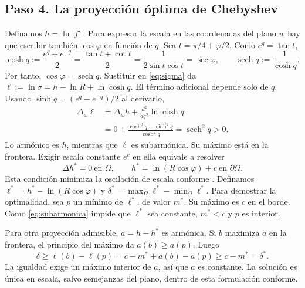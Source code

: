 \subsection{Paso 4. La proyección óptima de Chebyshev}
Definamos $h=\ln|f'|$. Para expresar la escala en las coordenadas del plano $w$ hay que escribir también $\cos\varphi$ en función de $q$. Sea $t=\pi/4+\varphi/2$. Como $e^q=\tan t$,
\begin{equation}
 \cosh q:=\frac{e^q+e^{-q}}2
 =\frac{\tan t+\cot t}2
 =\frac1{2\sin t\cos t}
 =\sec\varphi,\qquad \operatorname{sech}q:=\frac1{\cosh q}.
 \label{eq:hiperbolicas}
\end{equation}
Por tanto, $\cos\varphi=\operatorname{sech}q$. Sustituir en \eqref{eq:sigma} da $\ell:=\ln\sigma=h-\ln R+\ln\cosh q$. El término adicional depende solo de $q$. Usando $\sinh q=(e^q-e^{-q})/2$ al derivarlo,
\begin{equation}
 \begin{aligned}
 \Delta_w\ell&=\Delta_w h+\frac{d^2}{dq^2}\ln\cosh q\\
 &=0+\frac{\cosh^2q-\sinh^2q}{\cosh^2q}
 =\operatorname{sech}^2q>0.
 \end{aligned}\label{eq:subarmonica}
\end{equation}
Lo armónico es $h$, mientras que $\ell$ es subarmónica. Su máximo está en la frontera. Exigir escala constante $e^c$ en ella equivale a resolver
\begin{equation}
 \Delta h^*=0\ \text{en }\Omega,\qquad
 h^*=\ln(R\cos\varphi)+c\ \text{en }\partial\Omega.
 \label{eq:dirichlet}
\end{equation}
Esta condición minimiza la oscilación de escala conforme \cite{milnor1969,bermejo2005}. Definamos $\ell^*=h^*-\ln(R\cos\varphi)$ y $\delta^*=\max_\Omega\ell^*-\min_\Omega\ell^*$. Para demostrar la optimalidad, sea $p$ un mínimo de $\ell^*$, de valor $m^*$. Su máximo es $c$ en el borde. Como \eqref{eq:subarmonica} impide que $\ell^*$ sea constante, $m^*<c$ y $p$ es interior.

Para otra proyección admisible, $a=h-h^*$ es armónica. Si $b$ maximiza $a$ en la frontera, el principio del máximo da $a(b)\ge a(p)$. Luego
\begin{equation}
 \delta\ge\ell(b)-\ell(p)
 =c-m^*+a(b)-a(p)\ge c-m^*=\delta^*.
 \label{eq:optimalidad}
\end{equation}
La igualdad exige un máximo interior de $a$, así que $a$ es constante. La solución es única en escala, salvo semejanzas del plano, dentro de esta formulación conforme.

